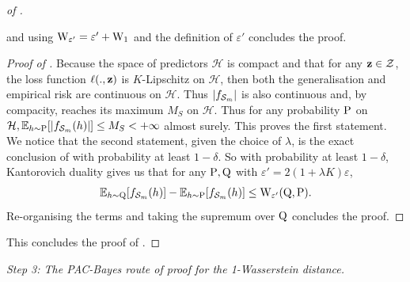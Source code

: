 \begin{proof}[of ]
\begin{lemma}
and using $\W_{\varepsilon'} = \varepsilon' + \W_{1}$ and the definition of $\varepsilon'$ concludes the proof.
\end{lemma}
\begin{proof}[Proof of ]
Because the space of predictors $\mathcal{H}$ is compact and that for any $\z\in\mathcal{Z}$, the loss function $\ell(.,\z)$ is $K$-Lipschitz on $\mathcal{H}$, then both the generalisation and empirical risk are continuous on $\mathcal{H}$. Thus $|f_{\Sm}|$ is also continuous and, by compacity, reaches its maximum $M_S$ on $\mathcal{H}$. Thus for any probability $\P$ on $\mathcal{H}, \mathbb{E}_{h\sim \P}[|f_{\Sm}(h)|] \leq M_S < +\infty$ almost surely. This proves the first statement.
We notice that the second statement, given the choice of $\lambda$, is the exact conclusion  of  with probability at least $1-\delta$.
So with probability at least $1-\delta$, Kantorovich duality gives us that for any $\P,\Q$ with $\varepsilon'= 2(1+ \lambda K) \varepsilon$,
\begin{align*}
\mathbb{E}_{h\sim \Q}[ f_{\Sm}(h)] - \mathbb{E}_{h\sim \P}[f_{\Sm}(h)] \leq \W_{\varepsilon'}(\Q,\P).
\end{align*}
Re-organising the terms and taking the supremum over $\Q$ concludes the proof.
\end{proof}
This concludes the proof of .
\end{proof}

\textit{Step 3: The PAC-Bayes route of proof for the 1-Wasserstein distance.}


